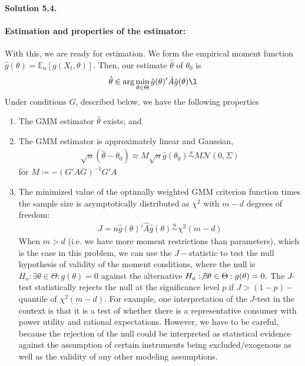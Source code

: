 \documentclass[11pt]{article}
\newenvironment{solution}[1]
    {\bigskip\noindent\textbf{Solution #1.} \par}
    {\medskip}
\newcommand{\ev}{\mathbb{E}}
\begin{document}
\begin{solution}{5.4}
\paragraph{Estimation and properties of the estimator:} With this, we are ready for estimation. We form the empirical moment function $\hat{g}(\theta) = \ev_n[g(X_t,\theta)].$ Then, our estimate $\hat{\theta}$ of $\theta_0$ is 
\begin{align*}
    \hat{\theta} \in \arg\min_{\theta\in\Theta} \hat{g}(\theta)'\hat{A}\hat{g}(\theta) \l
\end{align*}
Under conditions $G$, described below, we have the following properties
\begin{enumerate}
    \item The GMM estimator $\hat \theta$ exists; and
    \item The GMM estimator is approximately linear and Gaussian, 
    \begin{align*}
        \sqrt{n}(\hat{\theta} - \theta_0) \approx M \sqrt{n} \hat{g}(\theta_0) \overset{a}{\sim} M\mathcal{N}(0,\Sigma)
    \end{align*}
    for $M \coloneq -(G'AG)^{-1}G'A$
    \item The minimized value of the optimally weighted GMM criterion function times the sample size is asymptotically distributed as $\chi^2$ with $m-d$ degrees of freedom:
    \begin{align*}
        J = n \hat{g}(\theta)'\hat{A}\hat{g}(\theta) \overset{a}{\sim} \chi^2(m-d)
    \end{align*}
    When $m > d$ (i.e. we have more moment restrictions than parameters), which is the case in this problem, we can use the $J-$statistic to test the null hypothesis of validity of the moment conditions, where the null is $H_o: \exists\theta \in \Theta: g(\theta) = 0$ against the alternative $H_a: \not\exists\theta \in \Theta: g(\theta) = 0.$ The $J$-test statistically rejects the null at the significance level $p$ if $J > (1-p)-$quantile of $\chi^2(m-d).$ For example, one interpretation of the $J$-test in the \cite{hs1982gmm} context is that it is a test of whether there is a representative consumer with power utility and rational expectations. However, we have to be careful, because the rejection of the null could be interpreted as statistical evidence against the assumption of certain instruments being excluded/exogenous as well as the validity of any other modeling assumptions.
\end{enumerate}


\end{solution}
\end{document}
